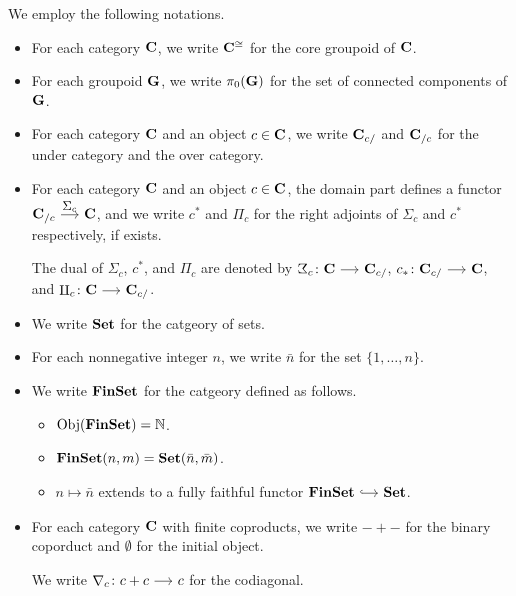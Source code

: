 \documentclass[a4paper,dvipsnames, 11pt]{amsart} %
\begin{document}
\maketitle
\cite{FS19}
\begin{notation}
	We employ the following notations. 
	\begin{itemize}
		\item %
			For each category $\mathbf{C}$,
			we write ${\mathbf{C}}^{\cong}$ for the core groupoid of $\mathbf{C}$.
		\item %
			For each groupoid $\mathbf{G}$, we write $\pi_0(\mathbf{G})$ for the set of connected components of $\mathbf{G}$.
		\item %
			For each category $\mathbf{C}$ and an object $c\in\mathbf{C}$,
			we write $\mathbf{C}_{c/}$ and $\mathbf{C}_{/c}$ for the under category and the over category.
		\item %
			For each category $\mathbf{C}$ and an object $c\in\mathbf{C}$,
			the domain part defines a functor $\one{C}_{/c}\arr"\Sigma_c"\one{C}$,
			and we write $c^*$ and $\Pi_c$ for the right adjoints of $\Sigma_c$ and $c^*$ respectively,
			if exists.

			The dual of $\Sigma_c$, $c^*$, and $\Pi_c$ are
			denoted by $\arbSigma_c\colon\one{C}\arr\one{C}_{c/}$, $c_*\colon\one{C}_{c/}\arr\one{C}$, and $\arbPi_c\colon\one{C}\arr\one{C}_{c/}$.
		\item %
			We write $\mathbf{Set}$ for the catgeory of sets.
		\item %
			For each nonnegative integer $n$,
			we write $\bar{n}$ for the set $\{1,\ldots,n\}$.
		\item %
			We write $\mathbf{FinSet}$ for the catgeory defined as follows.
			\begin{itemize}
				\item %
					$\operatorname{\mathrm{Obj}}(\mathbf{FinSet})=\mathbb{N}$.
				\item %
					$\mathbf{FinSet}(n,m)=\mathbf{Set}(\bar{n},\bar{m})$.
				\item %
					$n\mapsto\bar{n}$ extends to a fully faithful functor $\FinSet\arr[hook]\Set$.
			\end{itemize}
		\item %
			For each category $\mathbf{C}$ with finite coproducts,
			we write $-+-$ for the binary coporduct and $\emptyset$ for the initial object.

			We write ${\Atled}_c\colon c+c\arr c$ for the codiagonal.
	\end{itemize}
\end{notation}
\end{document}
